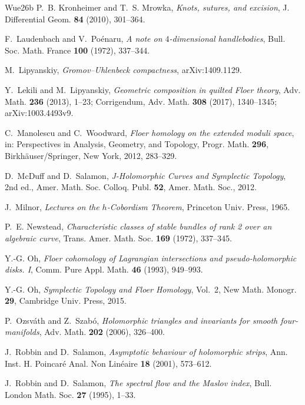\documentclass[11pt]{amsart}
\theoremstyle{definition}
\theoremstyle{remark}
\theoremstyle{plain}
\numberwithin{equation}{section}
\begin{document}
\begin{thebibliography}{Wue26b}
P.~B. Kronheimer and T.~S. Mrowka, \emph{Knots, sutures, and excision},
J. Differential Geom. \textbf{84} (2010), 301--364.

F.~Laudenbach and V.~Po\'enaru, \emph{A note on $4$-dimensional
handlebodies}, Bull. Soc. Math. France \textbf{100} (1972), 337--344.

M.~Lipyanskiy, \emph{Gromov--Uhlenbeck compactness}, arXiv:1409.1129.

Y.~Lekili and M.~Lipyanskiy, \emph{Geometric composition in quilted Floer
theory}, Adv. Math. \textbf{236} (2013), 1--23; Corrigendum, Adv. Math.
\textbf{308} (2017), 1340--1345; arXiv:1003.4493v9.

C.~Manolescu and C.~Woodward, \emph{Floer homology on the extended moduli
space}, in: Perspectives in Analysis, Geometry, and Topology, Progr. Math.
\textbf{296}, Birkh\"auser/Springer, New York, 2012, 283--329.

D.~McDuff and D.~Salamon, \emph{J-Holomorphic Curves and Symplectic
Topology}, 2nd ed., Amer. Math. Soc. Colloq. Publ. \textbf{52}, Amer. Math.
Soc., 2012.

J.~Milnor, \emph{Lectures on the $h$-Cobordism Theorem}, Princeton Univ.
Press, 1965.

P.~E. Newstead, \emph{Characteristic classes of stable bundles of rank 2
over an algebraic curve}, Trans. Amer. Math. Soc. \textbf{169} (1972),
337--345.

Y.-G. Oh, \emph{Floer cohomology of Lagrangian intersections and
pseudo-holomorphic disks. I}, Comm. Pure Appl. Math. \textbf{46} (1993),
949--993.

Y.-G. Oh, \emph{Symplectic Topology and Floer Homology}, Vol.~2, New Math.
Monogr. \textbf{29}, Cambridge Univ. Press, 2015.

P.~Ozsv\'ath and Z.~Szab\'o, \emph{Holomorphic triangles and invariants
for smooth four-manifolds}, Adv. Math. \textbf{202} (2006), 326--400.

J.~Robbin and D.~Salamon, \emph{Asymptotic behaviour of holomorphic strips}, Ann.
Inst. H. Poincar\'e Anal. Non Lin\'eaire \textbf{18} (2001), 573--612.

J.~Robbin and D.~Salamon, \emph{The spectral flow and the Maslov index},
Bull. London Math. Soc. \textbf{27} (1995), 1--33.


\end{thebibliography}
\end{document}
